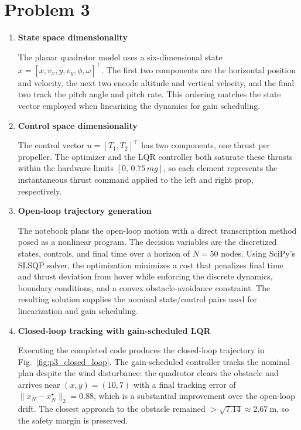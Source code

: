 \documentclass [11pt]{article}
\begin{document}
\section*{Problem 3}
    \begin{enumerate}[label=(\roman*)]
        \item \textbf{State space dimensionality}

        The planar quadrotor model uses a six-dimensional state $x = [x, v_x, y, v_y, \phi, \omega]^\top$. The first two components are the horizontal position and velocity, the next two encode altitude and vertical velocity, and the final two track the pitch angle and pitch rate. This ordering matches the state vector employed when linearizing the dynamics for gain scheduling.

        \item \textbf{Control space dimensionality}

        The control vector $u = [T_1, T_2]^\top$ has two components, one thrust per propeller. The optimizer and the LQR controller both saturate these thrusts within the hardware limits $\left[0,\,0.75\, m g\right]$, so each element represents the instantaneous thrust command applied to the left and right prop, respectively.

        \item \textbf{Open-loop trajectory generation}

        The notebook plans the open-loop motion with a direct transcription method posed as a nonlinear program. The decision variables are the discretized states, controls, and final time over a horizon of $N=50$ nodes. Using SciPy's SLSQP solver, the optimization minimizes a cost that penalizes final time and thrust deviation from hover while enforcing the discrete dynamics, boundary conditions, and a convex obstacle-avoidance constraint. The resulting solution supplies the nominal state/control pairs used for linearization and gain scheduling.

        \item \textbf{Closed-loop tracking with gain-scheduled LQR}

        Executing the completed code produces the closed-loop trajectory in Fig.~\ref{fig:p3_closed_loop}. The gain-scheduled controller tracks the nominal plan despite the wind disturbance: the quadrotor clears the obstacle and arrives near $(x,y) = (10,7)$ with a final tracking error of $\|x_N - x_N^\star\|_2 = 0.88$, which is a substantial improvement over the open-loop drift. The closest approach to the obstacle remained $> \sqrt{7.14} \approx 2.67~\text{m}$, so the safety margin is preserved.


\end{enumerate}
\end{document}
